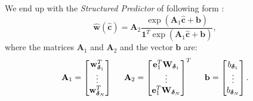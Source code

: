 \documentclass[12pt, draftclsnofoot, onecolumn]{IEEEtran}
\begin{document}
We end up with the \textit{Structured Predictor} of following form \cite{turan2019learning}:
\begin{equation}
\hat{\mathbf{w}}(\hat{\mathbf{c}})  = \mathbf{A}_2 \dfrac{ \exp{(\mathbf{A}_1\hat{\mathbf{c}}+ \mathbf{b} )} } { \mathbf{1}^T\exp{(\mathbf{A}_1\hat{\mathbf{c}}+ \mathbf{b})}},
\label{StrucPred}
\end{equation}
where the matrices $\mathbf{A}_1$ and $\mathbf{A}_2$ and the vector $\mathbf{b}$ are:
\begin{equation}
    \mathbf{A}_1 = 
       \begin{bmatrix}
        \mathbf{w}^T_{\boldsymbol{\delta}_1} \\
        \vdots \\
        \mathbf{w}^T_{\boldsymbol{\delta}_N}
\end{bmatrix} \hspace{0.5cm}
\mathbf{A}_2 = 
\begin{bmatrix}
        \mathbf{e}_1^T\mathbf{W}_{\boldsymbol{\delta}_1} \\
        \vdots \\
        \mathbf{e}_1^T\mathbf{W}_{\boldsymbol{\delta}_N}
\end{bmatrix}^T \hspace{0.5cm}
\mathbf{b} = 
\begin{bmatrix}
        b_{\boldsymbol{\delta}_1}\\
        \vdots \\
        b_{\boldsymbol{\delta}_N}
\end{bmatrix}.
\label{A1A2b}
\end{equation}
\end{document}
